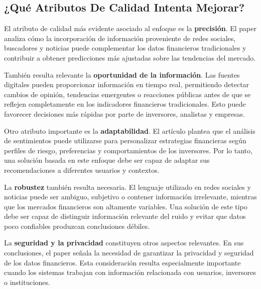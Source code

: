\subsection{¿Qué Atributos De Calidad Intenta Mejorar?}
\vspace{2mm}

El atributo de calidad más evidente asociado al enfoque es la \textbf{precisión}. El paper analiza cómo la incorporación de información proveniente de redes sociales, buscadores y noticias puede complementar los datos financieros tradicionales y contribuir a obtener predicciones más ajustadas sobre las tendencias del mercado.

\vspace{2mm}

También resulta relevante la \textbf{oportunidad de la información}. Las fuentes digitales pueden proporcionar información en tiempo real, permitiendo detectar cambios de opinión, tendencias emergentes o reacciones públicas antes de que se reflejen completamente en los indicadores financieros tradicionales. Esto puede favorecer decisiones más rápidas por parte de inversores, analistas y empresas.

\vspace{2mm}

Otro atributo importante es la \textbf{adaptabilidad}. El artículo plantea que el análisis de sentimientos puede utilizarse para personalizar estrategias financieras según perfiles de riesgo, preferencias y comportamientos de los inversores. Por lo tanto, una solución basada en este enfoque debe ser capaz de adaptar sus recomendaciones a diferentes usuarios y contextos.

\vspace{2mm}

La \textbf{robustez} también resulta necesaria. El lenguaje utilizado en redes sociales y noticias puede ser ambiguo, subjetivo o contener información irrelevante, mientras que los mercados financieros son altamente variables. Una solución de este tipo debe ser capaz de distinguir información relevante del ruido y evitar que datos poco confiables produzcan conclusiones débiles.

\vspace{2mm}

La \textbf{seguridad y la privacidad} constituyen otros aspectos relevantes. En sus conclusiones, el paper señala la necesidad de garantizar la privacidad y seguridad de los datos financieros. Esta consideración resulta especialmente importante cuando los sistemas trabajan con información relacionada con usuarios, inversores o instituciones.

